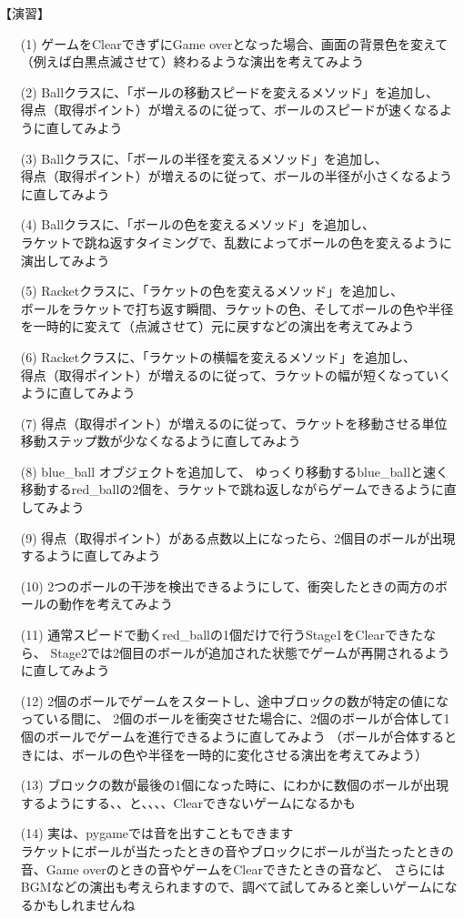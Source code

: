 \documentclass[uplatex,a4paper,11pt,oneside,openany]{jsbook}
\begin{document}
【演習】
\begin{enumerate}
  \item[(1)] ゲームをClearできずにGame overとなった場合、画面の背景色を変えて（例えば白黒点滅させて）終わるような演出を考えてみよう
  \item[(2)] Ballクラスに、「ボールの移動スピードを変えるメソッド」を追加し、\\
  得点（取得ポイント）が増えるのに従って、ボールのスピードが速くなるように直してみよう
  \item[(3)] Ballクラスに、「ボールの半径を変えるメソッド」を追加し、\\
  得点（取得ポイント）が増えるのに従って、ボールの半径が小さくなるように直してみよう
  \item[(4)] Ballクラスに、「ボールの色を変えるメソッド」を追加し、\\
  ラケットで跳ね返すタイミングで、乱数によってボールの色を変えるように演出してみよう
  \item[(5)] Racketクラスに、「ラケットの色を変えるメソッド」を追加し、\\
  ボールをラケットで打ち返す瞬間、ラケットの色、そしてボールの色や半径を一時的に変えて（点滅させて）元に戻すなどの演出を考えてみよう
  \item[(6)] Racketクラスに、「ラケットの横幅を変えるメソッド」を追加し、\\
  得点（取得ポイント）が増えるのに従って、ラケットの幅が短くなっていくように直してみよう
  \item[(7)] 得点（取得ポイント）が増えるのに従って、ラケットを移動させる単位移動ステップ数が少なくなるように直してみよう
  \item[(8)] blue\_ball オブジェクトを追加して、
  ゆっくり移動するblue\_ballと速く移動するred\_ballの2個を、ラケットで跳ね返しながらゲームできるように直してみよう
  \item[(9)] 得点（取得ポイント）がある点数以上になったら、2個目のボールが出現するように直してみよう
  \item[(10)] 2つのボールの干渉を検出できるようにして、衝突したときの両方のボールの動作を考えてみよう
  \item[(11)] 通常スピードで動くred\_ballの1個だけで行うStage1をClearできたなら、
  Stage2では2個目のボールが追加された状態でゲームが再開されるように直してみよう
  \item[(12)] 2個のボールでゲームをスタートし、途中ブロックの数が特定の値になっている間に、
  2個のボールを衝突させた場合に、2個のボールが合体して1個のボールでゲームを進行できるように直してみよう
  （ボールが合体するときには、ボールの色や半径を一時的に変化させる演出を考えてみよう）
  \item[(13)] ブロックの数が最後の1個になった時に、にわかに数個のボールが出現するようにする、、と、、、、Clearできないゲームになるかも
  \item[(14)] 実は、pygameでは音を出すこともできます\\
  ラケットにボールが当たったときの音やブロックにボールが当たったときの音、Game overのときの音やゲームをClearできたときの音など、
  さらにはBGMなどの演出も考えられますので、調べて試してみると楽しいゲームになるかもしれませんね
\end{enumerate}
\end{document}
